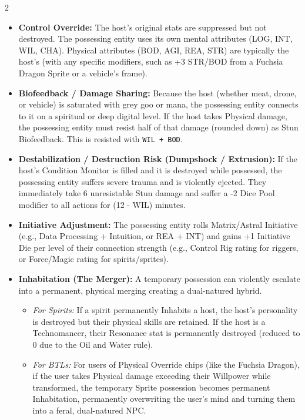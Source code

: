 \documentclass[
  oneside]{article}
\providecommand{\tightlist}{%
  \setlength{\itemsep}{0pt}\setlength{\parskip}{0pt}}
\begin{document}
\begin{multicols}{2}
\begin{itemize}
\tightlist
\item
  \textbf{Control Override:} The host's original
  stats are suppressed but not destroyed. The
  possessing entity uses its own mental attributes
  (LOG, INT, WIL, CHA). Physical attributes (BOD,
  AGI, REA, STR) are typically the host's (with
  any specific modifiers, such as +3 STR/BOD from
  a Fuchsia Dragon Sprite or a vehicle's frame).
\item
  \textbf{Biofeedback / Damage Sharing:} Because
  the host (whether meat, drone, or vehicle) is
  saturated with grey goo or mana, the possessing
  entity connects to it on a spiritual or deep
  digital level. If the host takes Physical
  damage, the possessing entity must resist half
  of that damage (rounded down) as Stun
  Biofeedback. This is resisted with
  \texttt{WIL\ +\ BOD}.
\item
  \textbf{Destabilization / Destruction Risk
  (Dumpshock / Extrusion):} If the host's
  Condition Monitor is filled and it is destroyed
  while possessed, the possessing entity suffers
  severe trauma and is violently ejected. They
  immediately take 6 unresistable Stun damage and
  suffer a -2 Dice Pool modifier to all actions
  for (12 - WIL) minutes.
\item
  \textbf{Initiative Adjustment:} The possessing
  entity rolls Matrix/Astral Initiative (e.g.,
  Data Processing + Intuition, or REA + INT) and
  gains +1 Initiative Die per level of their
  connection strength (e.g., Control Rig rating
  for riggers, or Force/Magic rating for
  spirits/sprites).
\item
  \textbf{Inhabitation (The Merger):} A temporary
  possession can violently escalate into a
  permanent, physical merging creating a
  dual-natured hybrid.

  \begin{itemize}
  \tightlist
  \item
    \emph{For Spirits:} If a spirit permanently
    Inhabits a host, the host's personality is
    destroyed but their physical skills are
    retained. If the host is a Technomancer, their
    Resonance stat is permanently destroyed
    (reduced to 0 due to the Oil and Water rule).
  \item
    \emph{For BTLs:} For users of Physical
    Override chips (like the Fuchsia Dragon), if
    the user takes Physical damage exceeding their
    Willpower while transformed, the temporary
    Sprite possession becomes permanent
    Inhabitation, permanently overwriting the
    user's mind and turning them into a feral,
    dual-natured NPC.
  \end{itemize}
\end{itemize}


\end{multicols}
\end{document}
